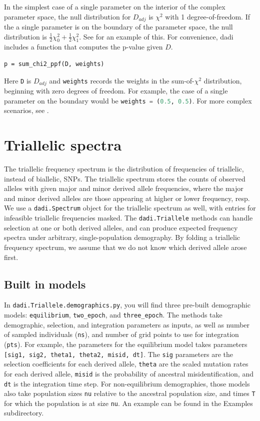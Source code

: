 \documentclass[12pt]{article}
\makeatletter
\newcommand{\dadi}{dadi\xspace}
\newcommand{\py}[1]{\lstinline[language=Python, showstringspaces=False]@#1@}
\makeatother
\begin{document}
In the simplest case of a single parameter on the interior of the complex parameter space, the null distribution for $D_{adj}$ is $\chi^2$ with 1 degree-of-freedom.
If the a single parameter is on the boundary of the parameter space, the null distribution is $\frac{1}{2}\chi^2_0 + \frac{1}{2}\chi^2_1$.
See \cite{Coffman2016} for an example of this.
For convenience, \dadi includes a function that computes the p-value given $D$.
\begin{lstlisting}
p = sum_chi2_ppf(D, weights)
\end{lstlisting}
Here \py{D} is $D_{adj}$ and \py{weights} records the weights in the sum-of-$\chi^2$ distribution, beginning with zero degrees of freedom.
For example, the case of a single parameter on the boundary would be \py{weights = (0.5, 0.5)}.
For more complex scenarios, see \cite{Self1987}.

\section{Triallelic spectra}
The triallelic frequency spectrum is the distribution of frequencies of triallelic, instead of biallelic, SNPs.
The triallelic spectrum stores the counts of observed alleles with given major and minor derived allele frequencies, where the major and minor derived alleles are those appearing at higher or lower frequency, resp.
We use a \py{dadi.Spectrum} object for the triallelic spectrum as well, with entries for infeasible triallelic frequencies masked.
The \py{dadi.Triallele} methods can handle selection at one or both derived alleles, and can produce expected frequency spectra under arbitrary, single-population demography.
By folding a triallelic frequency spectrum, we assume that we do not know which derived allele arose first.
\subsection{Built in models}
In \py{dadi.Triallele.demographics.py}, you will find three pre-built demographic models: \py{equilibrium}, \py{two_epoch}, and \py{three_epoch}.
The methods take demographic, selection, and integration parameters as inputs, as well as number of sampled individuals (\py{ns}), and number of grid points to use for integration (\py{pts}).
For example, the parameters for the equilibrium model takes parameters \py{[sig1, sig2, theta1, theta2, misid, dt]}.
The \py{sig} parameters are the selection coefficients for each derived allele, \py{theta} are the scaled mutation rates for each derived allele, \py{misid} is the probability of ancestral misidentification, and \py{dt} is the integration time step.
For non-equilibrium demographies, those models also take population sizes \py{nu} relative to the ancestral population size, and times \py{T} for which the population is at size \py{nu}.
An example can be found in the Examples subdirectory.
\end{document}
